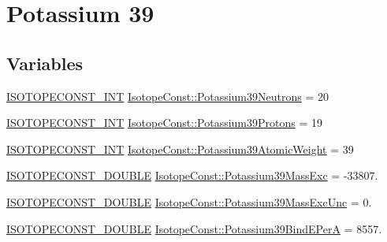 \hypertarget{group___isotope_const-_potassium-_k39}{}\section{Potassium 39}
\label{group___isotope_const-_potassium-_k39}
\subsection*{Variables}
\begin{DoxyCompactItemize}
\item 
\mbox{\hyperlink{group___isotope_const-_macros_ga5f18360b3e99483a35c32d789e62621c}{I\+S\+O\+T\+O\+P\+E\+C\+O\+N\+S\+T\+\_\+\+I\+NT}} \mbox{\hyperlink{group___isotope_const-_potassium-_k39_gac3b71d021a94147abd8fd13fee1fd744}{Isotope\+Const\+::\+Potassium39\+Neutrons}} = 20
\item 
\mbox{\hyperlink{group___isotope_const-_macros_ga5f18360b3e99483a35c32d789e62621c}{I\+S\+O\+T\+O\+P\+E\+C\+O\+N\+S\+T\+\_\+\+I\+NT}} \mbox{\hyperlink{group___isotope_const-_potassium-_k39_gaede42f9f4cb8d7b0cf20090b25bd839b}{Isotope\+Const\+::\+Potassium39\+Protons}} = 19
\item 
\mbox{\hyperlink{group___isotope_const-_macros_ga5f18360b3e99483a35c32d789e62621c}{I\+S\+O\+T\+O\+P\+E\+C\+O\+N\+S\+T\+\_\+\+I\+NT}} \mbox{\hyperlink{group___isotope_const-_potassium-_k39_gae6f3fbcda392a8e8db0a5d4d86795608}{Isotope\+Const\+::\+Potassium39\+Atomic\+Weight}} = 39
\item 
\mbox{\hyperlink{group___isotope_const-_macros_ga8f45a7272ce02c0b4c65c44636ed719a}{I\+S\+O\+T\+O\+P\+E\+C\+O\+N\+S\+T\+\_\+\+D\+O\+U\+B\+LE}} \mbox{\hyperlink{group___isotope_const-_potassium-_k39_gad1f510bcefdf615711ba62dce228f5d1}{Isotope\+Const\+::\+Potassium39\+Mass\+Exc}} = -\/33807.
\item 
\mbox{\hyperlink{group___isotope_const-_macros_ga8f45a7272ce02c0b4c65c44636ed719a}{I\+S\+O\+T\+O\+P\+E\+C\+O\+N\+S\+T\+\_\+\+D\+O\+U\+B\+LE}} \mbox{\hyperlink{group___isotope_const-_potassium-_k39_gae3548393997c5168d0f83cf5ae61f331}{Isotope\+Const\+::\+Potassium39\+Mass\+Exc\+Unc}} = 0.
\item 
\mbox{\hyperlink{group___isotope_const-_macros_ga8f45a7272ce02c0b4c65c44636ed719a}{I\+S\+O\+T\+O\+P\+E\+C\+O\+N\+S\+T\+\_\+\+D\+O\+U\+B\+LE}} \mbox{\hyperlink{group___isotope_const-_potassium-_k39_ga85414a1a7b79c505918af929379f300c}{Isotope\+Const\+::\+Potassium39\+Bind\+E\+PerA}} = 8557.
\item 

\end{DoxyCompactItemize}
